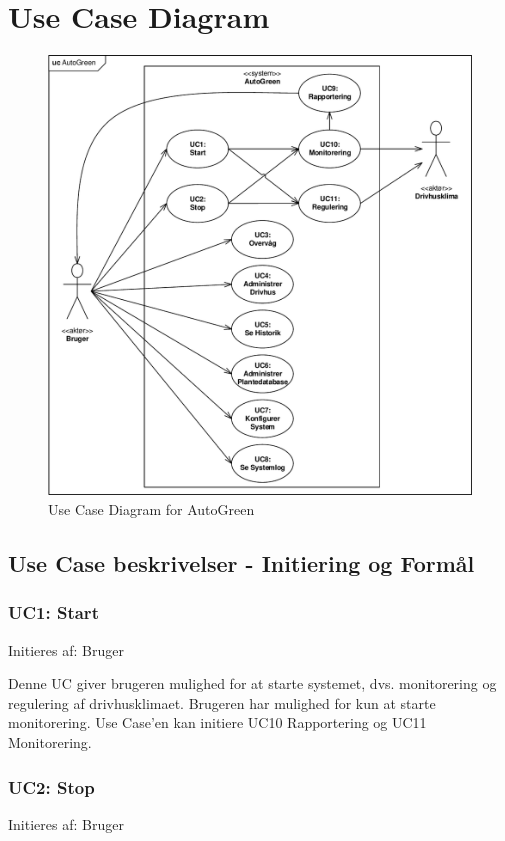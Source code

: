 \section{Use Case Diagram}
\begin{figure}[h]
\centering 
\includegraphics[width={\textwidth-1cm}, trim=0 0 0 0, clip=true] {../fig/UC_Diagram.pdf}
\caption{Use Case Diagram for AutoGreen}
\label{fig:use_case_diagram}
\end{figure}

\clearpage

\subsection{Use Case beskrivelser - Initiering og Formål}
\subsubsection{UC1: Start}
Initieres af: Bruger

Denne UC giver brugeren mulighed for at starte systemet, dvs. monitorering og regulering af drivhusklimaet. 
Brugeren har mulighed for kun at starte monitorering. Use Case’en kan initiere UC10 Rapportering og UC11 Monitorering.

\subsubsection{UC2: Stop}
Initieres af: Bruger

